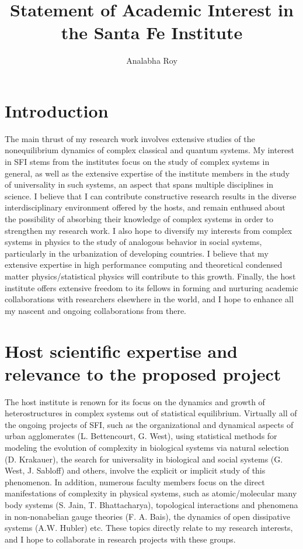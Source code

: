 \documentclass[a4paper,9pt]{article}
\title{Statement of Academic Interest in the Santa Fe Institute}
\author{Analabha Roy}
\begin{document}
\maketitle

\section{Introduction}
\label{sec:intro}
The main thrust of my research work involves extensive studies of the nonequilibrium dynamics of complex classical and quantum systems. 
My interest in SFI stems from the institutes focus on the study of complex systems in general, as well as the extensive expertise of the institute members in the study of universality in such systems,  an aspect that spans multiple disciplines in science. I believe that I can contribute constructive research results in the diverse interdisciplinary environment offered by the hosts, and remain enthused about the possibility of absorbing their knowledge of complex systems in order to strengthen my research work. I also hope to diversify my interests from complex systems in physics to the study of analogous behavior in social systems, particularly in the urbanization of developing countries. I believe that my extensive expertise in high performance computing and theoretical condensed matter physics/statistical physics will contribute to this growth. Finally, the host institute offers extensive freedom to its fellows in forming and nurturing academic collaborations with researchers elsewhere in the world, and I hope to enhance all my nascent and ongoing collaborations from there.

\section{Host scientific expertise and relevance to the proposed project}
\label{sec:host_expertise}
 
The host institute is renown for its focus on the dynamics and growth of heterostructures in complex systems out of statistical equilibrium. Virtually all of the ongoing projects of SFI, such as the organizational and dynamical aspects of urban agglomerates (L. Bettencourt, G. West), using statistical methods for modeling the evolution of complexity in biological systems via natural selection (D. Krakauer), the search for universality in biological and social systems (G. West, J. Sabloff) and others, involve the explicit or implicit study of this phenomenon. In addition, numerous faculty members focus on the direct manifestations of complexity in physical systems, such as  atomic/molecular many body systems (S. Jain, T. Bhattacharya), topological interactions and phenomena in non-nonabelian gauge theories (F. A. Bais), the dynamics of open dissipative systems (A.W. Hubler) etc. These topics directly relate to my research interests, and I hope to collaborate in research projects with these groups.
\end{document}
